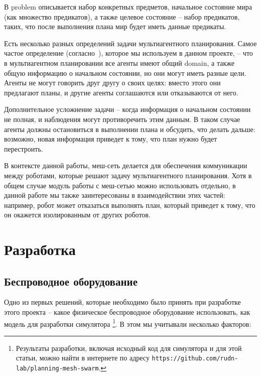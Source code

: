 \documentclass[%
]{article}
\begin{document}
В problem описывается набор конкретных предметов,
начальное состояние мира (как множество предикатов),
а также целевое состояние -- набор предикатов, таких, что
после выполнения плана мир будет иметь данные предикаты.

Есть несколько разных определений задачи мультиагентного планирования.
Самое частое определение (согласно~\cite{doi:10.3233/MGS-2009-0133}),
которое мы используем в данном проекте, --
что в мультиагентном планировании
все агенты имеют общий domain,
а также общую информацию о начальном состоянии,
но они могут иметь разные цели.
Агенты не могут говорить друг другу о своих целях:
вместо этого они предлагают планы,
и другие агенты соглашаются или отказываются от него.

Дополнительное усложнение задачи --
когда информация о начальном состоянии не полная,
и наблюдения могут противоречить этим данным.
В таком случае агенты должны остановиться в выполнении плана
и обсудить, что делать дальше:
возможно, новая информация приведет к тому, что план нужно будет перестроить.

В контексте данной работы, меш-сеть делается для обеспечения коммуникации между роботами,
которые решают задачу мультиагентного планирования.
Хотя в общем случае модуль работы с меш-сетью можно использовать отдельно,
в данной работе мы также заинтересованы в взаимодействии этих частей:
например, робот может отказаться выполнять план,
который приведет к тому, что он окажется изолированным от других роботов.


\section{Разработка} 
\label{sec:base-section}

\subsection{Беспроводное оборудование}

Одно из первых решений, которые необходимо было принять при разработке этого проекта --
какое физическое беспроводное оборудование использовать, как модель для разработки
симулятора \footnote{Результаты разработки, включая исходный код для симулятора и для этой статьи, можно найти в интернете по адресу \texttt{https://github.com/rudn-lab/planning-mesh-swarm}.}.
В этом мы учитывали несколько факторов:
\end{document}
